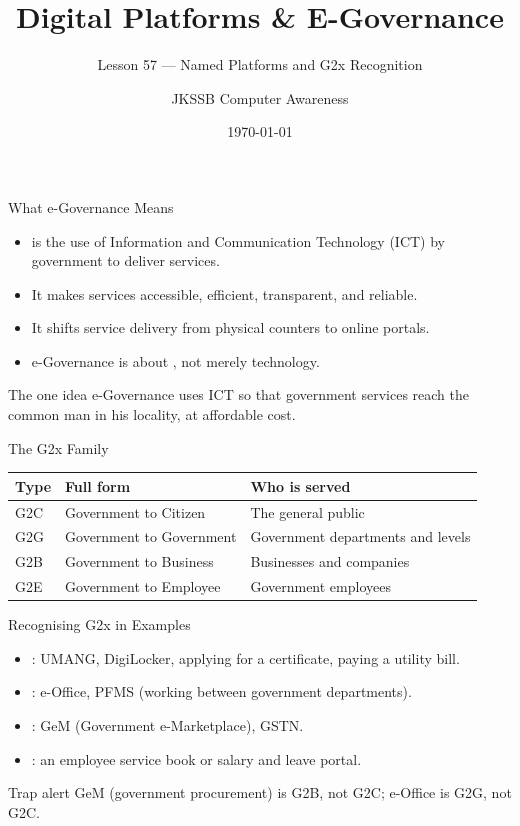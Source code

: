 \documentclass[aspectratio=169]{beamer}
\title{Digital Platforms \& E-Governance}
\subtitle{Lesson 57 --- Named Platforms and G2x Recognition}
\author{JKSSB Computer Awareness}
\date{\today}
\begin{document}
\frame{\titlepage}

\begin{frame}{What e-Governance Means}
  \begin{itemize}
    \item {} is the use of Information and Communication
      Technology (ICT) by government to deliver services.
    \item It makes services accessible, efficient, transparent, and reliable.
    \item It shifts service delivery from physical counters to online portals.
    \item e-Governance is about , not merely technology.
  \end{itemize}
  \begin{block}{The one idea}
    e-Governance uses ICT so that government services reach the common man in
    his locality, at affordable cost.
  \end{block}
\end{frame}

\begin{frame}{The G2x Family}
  \begin{center}
    \begin{tabular}{p{}p{}p{}}
      \toprule
      \textbf{Type} & \textbf{Full form} & \textbf{Who is served} \\
      \midrule
      G2C & Government to Citizen & The general public \\
      G2G & Government to Government & Government departments and levels \\
      G2B & Government to Business & Businesses and companies \\
      G2E & Government to Employee & Government employees \\
      \bottomrule
    \end{tabular}
  \end{center}
  \vspace{0.25cm}
\end{frame}

\begin{frame}{Recognising G2x in Examples}
  \begin{itemize}
    \item {}: UMANG, DigiLocker, applying for a certificate, paying a
      utility bill.
    \item {}: e-Office, PFMS (working between government
      departments).
    \item {}: GeM (Government e-Marketplace), GSTN.
    \item {}: an employee service book or salary and leave portal.
  \end{itemize}
  \begin{alertblock}{Trap alert}
    GeM (government procurement) is G2B, not G2C; e-Office is G2G, not G2C.
  \end{alertblock}
\end{frame}
\end{document}
